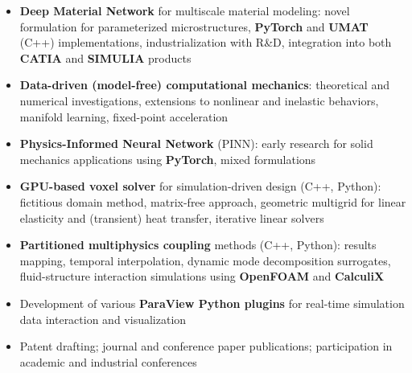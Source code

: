 \documentclass[10pt,a4paper,ragged2e,withhyper]{altacv}
\begin{document}
\begin{paracol}{2}

  \begin{itemize}
    \item \textbf{Deep Material Network} for multiscale material modeling: novel formulation for parameterized microstructures, \textbf{PyTorch} and \textbf{UMAT} (C++) implementations, industrialization with R\&D, integration into both \textbf{CATIA} and \textbf{SIMULIA} products
    \item \textbf{Data-driven (model-free) computational mechanics}: theoretical and numerical investigations, extensions to nonlinear and inelastic behaviors, manifold learning, fixed-point acceleration
    \item \textbf{Physics-Informed Neural Network} (PINN): early research for solid mechanics applications using \textbf{PyTorch}, mixed formulations
    \item \textbf{GPU-based voxel solver} for simulation-driven design (C++, Python): fictitious domain method, matrix-free approach, geometric multigrid for linear elasticity and (transient) heat transfer, iterative linear solvers
    \item \textbf{Partitioned multiphysics coupling} methods (C++, Python): results mapping, temporal interpolation, dynamic mode decomposition surrogates, fluid-structure interaction simulations using \textbf{OpenFOAM} and \textbf{CalculiX}
    \item Development of various \textbf{ParaView Python plugins} for real-time simulation data interaction and visualization
    \item Patent drafting; journal and conference paper publications; participation in academic and industrial conferences
  \end{itemize}

  \divider


\end{paracol}
\end{document}
